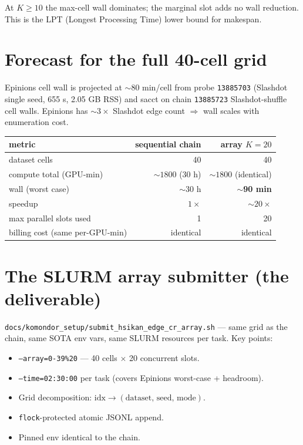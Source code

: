 \documentclass[11pt,a4paper]{article}
\begin{document}
At $K \geq 10$ the max-cell wall dominates; the marginal slot adds no
wall reduction. This is the LPT (Longest Processing Time) lower
bound for makespan.

\section{Forecast for the full 40-cell grid}

Epinions cell wall is projected at $\sim 80$ min/cell from probe
\texttt{13885703} (Slashdot single seed, 655 s, 2.05 GB RSS) and
sacct on chain \texttt{13885723} Slashdot-shuffle cell walls.
Epinions has $\sim 3\times$ Slashdot edge count $\Rightarrow$ wall
scales with enumeration cost.

\begin{center}
\begin{tabular}{lrr}
\toprule
metric & sequential chain & array $K=20$ \\
\midrule
dataset cells & 40 & 40 \\
compute total (GPU-min) & $\sim 1800$ (30 h) & $\sim 1800$ (identical) \\
wall (worst case) & $\sim$30 h & \textbf{$\sim$90 min} \\
speedup & $1\times$ & $\sim 20\times$ \\
max parallel slots used & 1 & 20 \\
billing cost (same per-GPU-min) & identical & identical \\
\bottomrule
\end{tabular}
\end{center}

\section{The SLURM array submitter (the deliverable)}

\texttt{docs/komondor\_setup/submit\_hsikan\_edge\_cr\_array.sh} ---
same grid as the chain, same SOTA env vars, same SLURM resources
per task. Key points:

\begin{itemize}[nosep]
  \item \texttt{--array=0-39\%20} --- 40 cells $\times$ 20 concurrent slots.
  \item \texttt{--time=02:30:00} per task (covers Epinions worst-case + headroom).
  \item Grid decomposition: $\text{idx} \to (\text{dataset, seed, mode})$.
  \item \texttt{flock}-protected atomic JSONL append.
  \item Pinned env identical to the chain.
\end{itemize}
\end{document}
